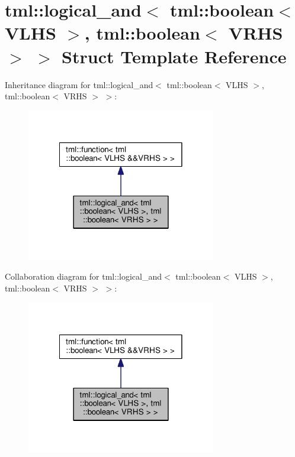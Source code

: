 \hypertarget{structtml_1_1logical__and_3_01tml_1_1boolean_3_01_v_l_h_s_01_4_00_01tml_1_1boolean_3_01_v_r_h_s_01_4_01_4}{\section{tml\+:\+:logical\+\_\+and$<$ tml\+:\+:boolean$<$ V\+L\+H\+S $>$, tml\+:\+:boolean$<$ V\+R\+H\+S $>$ $>$ Struct Template Reference}
\label{structtml_1_1logical__and_3_01tml_1_1boolean_3_01_v_l_h_s_01_4_00_01tml_1_1boolean_3_01_v_r_h_s_01_4_01_4}
}


Inheritance diagram for tml\+:\+:logical\+\_\+and$<$ tml\+:\+:boolean$<$ V\+L\+H\+S $>$, tml\+:\+:boolean$<$ V\+R\+H\+S $>$ $>$\+:
\nopagebreak
\begin{figure}[H]
\begin{center}
\leavevmode
\includegraphics[width=234pt]{structtml_1_1logical__and_3_01tml_1_1boolean_3_01_v_l_h_s_01_4_00_01tml_1_1boolean_3_01_v_r_h_s_01_4_01_4__inherit__graph}
\end{center}
\end{figure}


Collaboration diagram for tml\+:\+:logical\+\_\+and$<$ tml\+:\+:boolean$<$ V\+L\+H\+S $>$, tml\+:\+:boolean$<$ V\+R\+H\+S $>$ $>$\+:
\nopagebreak
\begin{figure}[H]
\begin{center}
\leavevmode
\includegraphics[width=234pt]{structtml_1_1logical__and_3_01tml_1_1boolean_3_01_v_l_h_s_01_4_00_01tml_1_1boolean_3_01_v_r_h_s_01_4_01_4__coll__graph}
\end{center}
\end{figure}
